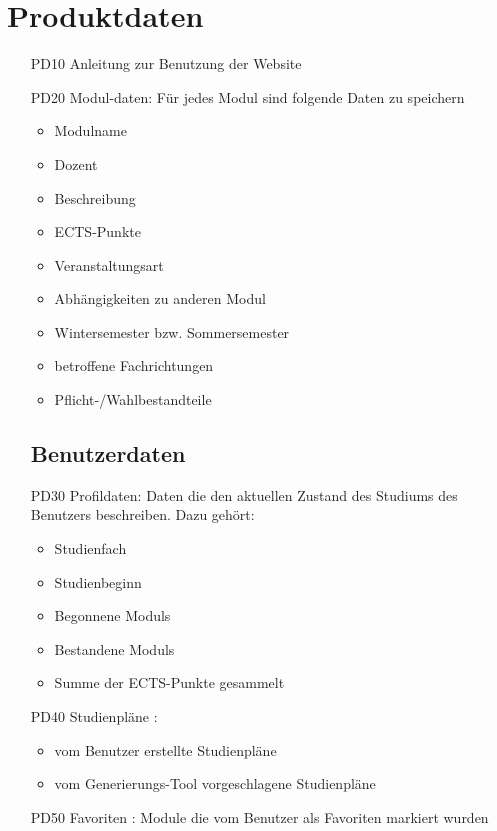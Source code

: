 \section{Produktdaten}
	\begin{itemize}[nosep]
	\subsection{Systemdaten}
	\item[PD10]Anleitung zur Benutzung der 		Website
	\item[PD20] \gls{Modul}-daten: Für jedes \gls{Modul} sind folgende Daten zu speichern	
	\begin{itemize}
	\item Modulname
	\item Dozent
	\item Beschreibung
	\item \gls{ECTS-Punkte}
	\item Veranstaltungsart
	\item Abhängigkeiten zu anderen \gls{Modul}
	\item Wintersemester bzw. Sommersemester
	\item betroffene Fachrichtungen 
	\item Pflicht-/Wahlbestandteile
	\end{itemize}	 
	\subsection{Benutzerdaten}
	\item[PD30]Profildaten: Daten die den aktuellen Zustand des Studiums des Benutzers beschreiben. Dazu gehört: 
		\begin{itemize}
		\item Studienfach
		\item Studienbeginn
		\item Begonnene \glspl{Modul}
		\item Bestandene \glspl{Modul} 
		\item Summe der \gls{ECTS-Punkte} gesammelt
		\end{itemize}
\item[PD40]Studienpläne :
\begin{itemize}
\item 	vom Benutzer erstellte Studienpläne 
\item	vom \gls{Generierungs-Tool} vorgeschlagene Studienpläne 
\end{itemize} 
\item[PD50] Favoriten : Module die vom Benutzer als Favoriten markiert wurden
\end{itemize}